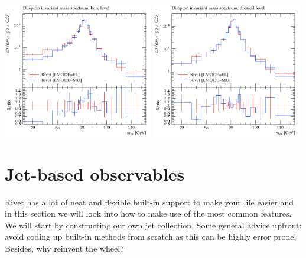 \documentclass[10pt,fleqn]{scrartcl}
\theoremstyle{exstyle}
\begin{document}
\clearpage

\begin{center}
\includegraphics[width=0.49\textwidth]{figures/mass_ll_bare.pdf}
\includegraphics[width=0.49\textwidth]{figures/mass_ll_dressed.pdf}
\end{center}


\section{Jet-based observables}

Rivet has a lot of neat and flexible built-in support to make your life easier
and in this section we will look into how to make use of the most common features.
We will start by constructing our own jet collection.
Some general advice upfront: avoid coding up built-in methods from scratch
as this can be highly error prone! Besides, why reinvent the wheel?
\end{document}

